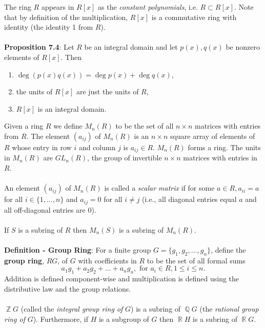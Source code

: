 \documentclass{article}
\DeclareMathOperator{\Z}{\mathbb{Z}}
\DeclareMathOperator{\Q}{\mathbb{Q}}
\DeclareMathOperator{\R}{\mathbb{R}}
\begin{document}
The ring $R$ appears in $R[x]$ as the \textit{constant polynomials}, i.e. $R \subset R[x]$. Note that by definition of the multiplication, $R[x]$ is a commutative ring with identity (the identity 1 from $R$). \\ \\
\textbf{Proposition 7.4}: Let $R$ be an integral domain and let $p(x), q(x)$ be nonzero elements of $R[x]$. Then \begin{enumerate}
    \item $\deg(p(x)q(x)) = \deg p(x) + \deg q(x)$,
    \item the units of $R[x]$ are just the units of $R$,
    \item $R[x]$ is an integral domain.
\end{enumerate} $ $ \\
Given a ring $R$ we define $M_n(R)$ to be the set of all $n \times n$ matrices with entries from $R$. The element $(a_{ij})$ of $M_n(R)$ is an $n \times n$ square array
of elements of $R$ whose entry in row $i$ and column $j$ is $a_{ij} \in R$. $M_n(R)$ forms a ring. The units in $M_n(R)$ are $GL_n(R)$, the group of invertible $n \times n$ matrices with entries in $R$. \\ \\
An element $(a_{ij})$ of $M_n(R)$ is called a \textit{scalar matrix} if for some $a \in R, a_{ii} = a$ for all $i \in \{ 1, \dots, n\}$ and $a_{ij} = 0$ for all $i \neq j$ (i.e., all diagonal entries equal $a$ and all off-diagonal entries are $0$). \\ \\
If $S$ is a subring of $R$ then $M_n(S)$ is a subring of $M_n(R)$. \\ \\
\textbf{Definition - Group Ring}: For a finite group $G = \{g_1, g_2, \dots, g_n\}$, define the \textbf{group ring}, $RG$, of $G$ with coefficients in $R$ to be the set of all formal sums $$a_1g_1 + a_2g_2 + \dots + a_ng_n, \text{ for } a_i \in R, 1 \leq i \leq n.$$ Addition is defined component-wise and multiplication is defined using the distributive law and the group relations. \\ \\
$\Z G$ (called the \textit{integral group ring of} $G$) is a subring of $\Q G$ (the \textit{rational group ring of} $G$). Furthermore, if $H$ is a subgroup of $G$ then $\R H$ is a subring of $\R G$. \\ \\
\end{document}
